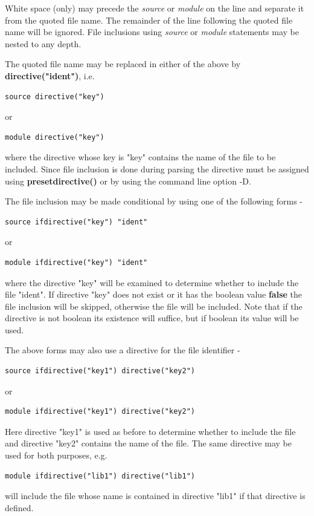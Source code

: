         White space (only) may precede the {\em source} or {\em module} on the
        line and separate it from the quoted file name. The remainder of the line
        following the quoted file name will be ignored. File inclusions using {\em
        source} or {\em module} statements may be nested to any depth.

        The quoted file name may be replaced in either of the above by
        {\bf directive("ident")}, i.e.
        \begin{lstlisting}[gobble=8, language=threepl]
           source directive("key")
        \end{lstlisting}
        or 
        \begin{lstlisting}[gobble=8, language=threepl]
           module directive("key")
        \end{lstlisting}
        where the directive whose key is "key" contains the name of the
        file to be included. Since file inclusion is done during parsing
        the directive must be assigned using {\bf presetdirective()}
         or by using the command line option
        -D.
        
        The file inclusion may be made conditional by using one of the following
        forms -
        \begin{lstlisting}[gobble=8, language=threepl]
           source ifdirective("key") "ident"
        \end{lstlisting}
        or 
        \begin{lstlisting}[gobble=8, language=threepl]
           module ifdirective("key") "ident"
        \end{lstlisting}
        where the directive "key" will be examined to determine whether to
        include the file "ident". If directive "key" does not exist or
        it has the boolean value {\bf false} the file inclusion will
        be skipped, otherwise the file will be included. Note that if the
        directive is not boolean its existence will suffice, but if
        boolean its value will be used.
        
        The above forms may also use a directive for the file identifier -
        \begin{lstlisting}[gobble=8, language=threepl]
           source ifdirective("key1") directive("key2")
        \end{lstlisting}
        or 
        \begin{lstlisting}[gobble=8, language=threepl]
           module ifdirective("key1") directive("key2")
        \end{lstlisting}
        Here directive "key1" is used as before to determine whether to
        include the file and directive "key2" contains the name of the
        file. The same directive may be used for both purposes, e.g.
        \begin{lstlisting}[gobble=8, language=threepl]
           module ifdirective("lib1") directive("lib1")
        \end{lstlisting}
        will include the file whose name is contained in directive "lib1"
        if that directive is defined.

